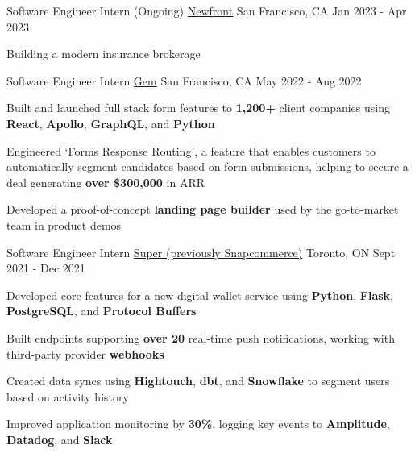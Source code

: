 
\begin{cventries}
  \cventry
    {Software Engineer Intern (Ongoing)} %
    {\href{https://www.newfront.com/}{Newfront}} %
    {San Francisco, CA} %
    {Jan 2023 - Apr 2023} %
    {
      \begin{cvitems} %
      \item {Building a modern insurance brokerage}
      \end{cvitems}
    }

  \cventry
    {Software Engineer Intern} %
    {\href{https://www.gem.com/}{Gem}} %
    {San Francisco, CA} %
    {May 2022 - Aug 2022} %
    {
      \begin{cvitems} %
      \item {Built and launched full stack form features to \textbf{1,200+} client companies using \textbf{React}, \textbf{Apollo}, \textbf{GraphQL}, and \textbf{Python}}
      \item {Engineered `Forms Response Routing', a feature that enables customers to automatically segment candidates based on form submissions, helping to secure a deal generating \textbf{over \$300,000} in ARR}
      \item {Developed a proof-of-concept \textbf{landing page builder} used by the go-to-market team in product demos}
      \end{cvitems}
    }

  \cventry
    {Software Engineer Intern} %
    {\href{https://www.super.com/}{Super (previously Snapcommerce)}} %
    {Toronto, ON} %
    {Sept 2021 - Dec 2021} %
    {
      \begin{cvitems} %
      \item {Developed core features for a new digital wallet service using \textbf{Python}, \textbf{Flask}, \textbf{PostgreSQL}, and \textbf{Protocol Buffers}}
      \item {Built endpoints supporting \textbf{over 20} real-time push notifications, working with third-party provider \textbf{webhooks}}
      \item {Created data syncs using \textbf{Hightouch}, \textbf{dbt}, and \textbf{Snowflake} to segment users based on activity history}
      \item {Improved application monitoring by \textbf{30\%}, logging key events to \textbf{Amplitude}, \textbf{Datadog}, and \textbf{Slack}}
      \end{cvitems}
    }


\end{cventries}
